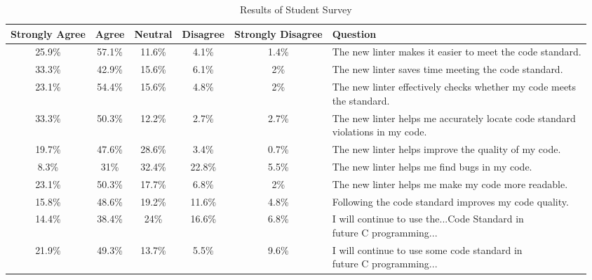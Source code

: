 \documentclass[sigconf]{acmart}
\begin{document}
\begin{table*}[t]
  \centering
  \begin{tabular}{cccccl}
    Strongly Agree & Agree  & Neutral & Disagree & Strongly Disagree & Question                                                          \\
    \hline
    25.9\%         & 57.1\% & 11.6\%  & 4.1\%    & 1.4\%             & The new linter makes it easier to meet the code standard.         \\
    \hline
    33.3\%         & 42.9\% & 15.6\%  & 6.1\%    & 2\%               & The new linter saves time meeting the code standard.              \\
    \hline
    23.1\%         & 54.4\% & 15.6\%  & 4.8\%    & 2\%               & \makecell{The new linter effectively checks whether my code meets \\ the standard.} \\
    \hline
    33.3\%         & 50.3\% & 12.2\%  & 2.7\%    & 2.7\%             & \makecell{The new linter helps me accurately locate code standard \\ violations in my code.} \\
    \hline
    19.7\%         & 47.6\% & 28.6\%  & 3.4\%    & 0.7\%             & The new linter helps improve the quality of my code.              \\
    \hline
    8.3\%          & 31\%   & 32.4\%  & 22.8\%   & 5.5\%             & The new linter helps me find bugs in my code.                     \\
    \hline
    23.1\%         & 50.3\% & 17.7\%  & 6.8\%    & 2\%               & The new linter helps me make my code more readable.               \\
    \hline
    15.8\%         & 48.6\% & 19.2\%  & 11.6\%   & 4.8\%             & Following the code standard improves my code quality.             \\
    \hline
    14.4\%         & 38.4\% & 24\%    & 16.6\%   & 6.8\%             & \makecell{I will continue to use the...Code Standard in           \\ future C programming...} \\
    \hline
    21.9\%         & 49.3\% & 13.7\%  & 5.5\%    & 9.6\%             & \makecell{I will continue to use some code standard in            \\ future C programming...} \\
    \hline
  \end{tabular}
  \caption{Results of Student Survey}
\end{table*}
\end{document}
